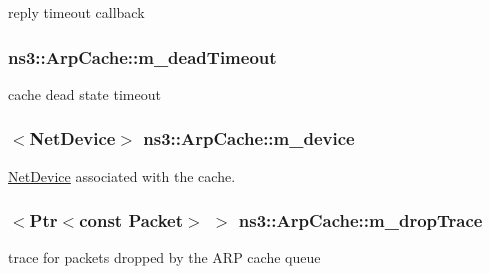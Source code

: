 reply timeout callback 

\subsubsection[{\texorpdfstring{m\+\_\+dead\+Timeout}{m_deadTimeout}}]{ ns3\+::\+Arp\+Cache\+::m\+\_\+dead\+Timeout\hspace{0.3cm}{\ttfamily [private]}}\hypertarget{classns3_1_1ArpCache_a399aae557ff88496c35d5f6beb842923}{}\label{classns3_1_1ArpCache_a399aae557ff88496c35d5f6beb842923}


cache dead state timeout 

\subsubsection[{\texorpdfstring{m\+\_\+device}{m_device}}]{$<${\bf Net\+Device}$>$ ns3\+::\+Arp\+Cache\+::m\+\_\+device\hspace{0.3cm}{\ttfamily [private]}}\hypertarget{classns3_1_1ArpCache_abeff23a1b2276b8cca9b3a023bce2850}{}\label{classns3_1_1ArpCache_abeff23a1b2276b8cca9b3a023bce2850}


\hyperlink{classns3_1_1NetDevice}{Net\+Device} associated with the cache. 

\subsubsection[{\texorpdfstring{m\+\_\+drop\+Trace}{m_dropTrace}}]{$<${\bf Ptr}$<$const {\bf Packet}$>$ $>$ ns3\+::\+Arp\+Cache\+::m\+\_\+drop\+Trace\hspace{0.3cm}{\ttfamily [private]}}\hypertarget{classns3_1_1ArpCache_a7f919ba19c2dbbae6f4d9251ded35fa3}{}\label{classns3_1_1ArpCache_a7f919ba19c2dbbae6f4d9251ded35fa3}


trace for packets dropped by the A\+RP cache queue 

